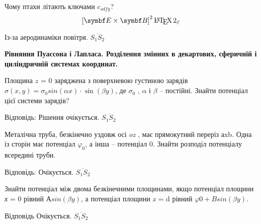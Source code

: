 \documentclass[]{ProblemBook}
\begin{document}
\begin{problem}
    Чому птахи літають ключами $c_{sdfg}$?
	\begin{equation}\label{key}
		\left[\Efield\times\Bfield\right]^2 \LaTeXe
	\end{equation}
\begin{solution}
	Із-за аеродинаміки повітря.
		$\overline{S_1S_2}$
\end{solution}
\end{problem}

\begin{center}
\textbf{Рівняння Пуассона і Лапласа. Розділення змінних в декартових, сферичній і циліндричній системах координат.}
\end{center}

\begin{problem}
    Площина $z$ = 0 заряджена з поверхневою густиною зарядів $σ(x,y) = σ_{0}sin(αx)\cdot \sin(βy)$, де $σ_{0}$ , $α$ і  $β$ – постійні. Знайти потенціал цієї системи зарядів?

	\begin{solution}
	Відповідь: Рішення очікується.
		$\overline{S_1S_2}$
\end{solution}
\end{problem}

\begin{problem}
    Металічна труба, безкінечно уздовж осі \textit{oz} , має прямокутний переріз аxb. Одна із сторін має потенціал $φ_{0}$, а інша – потенціал 0. Знайти розподіл потенціалу всередині труби.
	
\begin{solution}
	Відповідь: Очікується.
		$\overline{S_1S_2}$
\end{solution}
\end{problem}

\begin{problem}
    Знайти потенціал між двома безкінечними площинами, якщо потенціал площини \textit{х} = 0 рівний $Аsin(βy)$, а потенціал площини \textit{x} = d рівний $φ0 + Bsin(βy)$. 
	
\begin{solution}
	Відповідь Очікується.
		$\overline{S_1S_2}$
\end{solution}
\end{problem}
\end{document}

